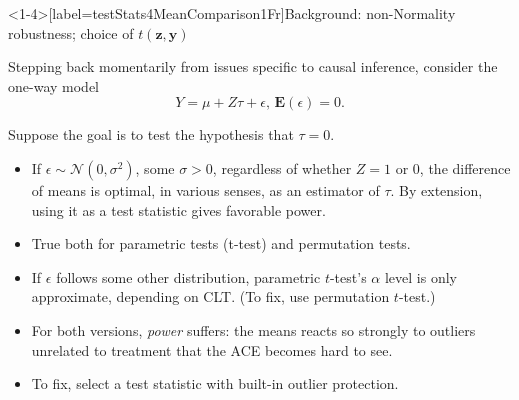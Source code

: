 \begin{frame}<1-4\mynoteonly>[label=testStats4MeanComparison1Fr]{Background:
    non-Normality robustness; choice of $t(\mathbf{z}, \mathbf{y})$}

Stepping back momentarily from issues specific to causal inference, consider the one-way model
$$
Y = \mu + Z\tau + \epsilon,\, \mathbf{E}(\epsilon) = 0.
$$

Suppose the goal is to test the hypothesis that $\tau = 0$.
  
\begin{itemize}[<+->]
\item If $\epsilon \sim \mathcal{N}(0, \sigma^{2})$, some $\sigma >0$, regardless of whether $Z=1$ or 0, the difference of means is optimal, in various senses, as an estimator of $\tau$. By extension, using it as a test statistic gives favorable power.
\item True both for parametric tests (t-test) and permutation tests.
\item If $\epsilon$ follows some other distribution, parametric
  $t$-test's $\alpha$ level is only approximate, depending on CLT. (To
  fix, use permutation $t$-test.)
\item For both versions, \textit{power} suffers: the means reacts so
  strongly to outliers unrelated to treatment that  the ACE becomes
  hard to see.
\item To fix, select a test statistic with built-in outlier
  protection.
\end{itemize}
\end{frame}


